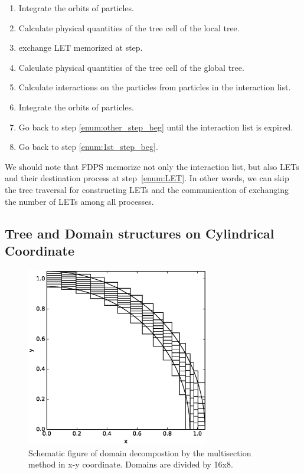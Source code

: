 \documentclass[oribibl]{llncs}
\begin{document}
\begin{enumerate}
\item Integrate the orbits of particles. \label{enum:1st_step_end}
  
\item Calculate physical quantities of the tree cell of the local tree. \label{enum:other_step_beg}

\item exchange LET memorized at step.

\item Calculate physical quantities of the tree cell of the global
  tree.

\item Calculate interactions on the particles from particles in the
  interaction list.

\item Integrate the orbits of particles. \label{enum:other_step_end}
    
\item Go back to step \ref{enum:other_step_beg} until the interaction
  list is expired.
    
\item Go back to step \ref{enum:1st_step_beg}.
  
\end{enumerate}

We should note that FDPS memorize not only the interaction list, but
also LETs and their destination process at step~\ref{enum:LET}. In
other words, we can skip the tree traversal for constructing LETs and
the communication of exchanging the number of LETs among all
processes.

\subsection{Tree and Domain structures on Cylindrical Coordinate}
\label{subsec:cylcoord}

\begin{figure}
  \centering \includegraphics[width=8cm,clip]{./fig/domain_cart.eps}
  \caption{Schematic figure of domain decompostion by the multisection
    method in x-y coordinate. Domains are divided by 16x8.}
  \label{fig:domain_cart}
\end{figure}
\end{document}

